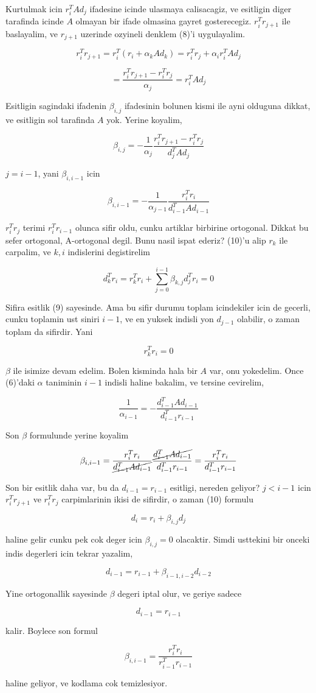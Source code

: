 \documentclass[12pt,fleqn]{article}\usepackage{../common}
\begin{document}
Kurtulmak icin $r_i^TAd_j$ ifadesine icinde ulasmaya calisacagiz, ve
esitligin diger tarafinda icinde $A$ olmayan bir ifade olmasina gayret
gosterecegiz. $r_i^Tr_{j+1}$ ile baslayalim, ve $r_{j+1}$ uzerinde ozyineli
denklem (8)'i uygulayalim. 

\[ r_i^Tr_{j+1} = r_i^T (r_i + \alpha_k A d_k)  = r_i^Tr_j + \alpha_i r_i^TAd_j \]

\[ = \frac{ r_i^Tr_{j+1} - r_i^Tr_j }{\alpha_j} =  r_i^TAd_j \]

Esitligin sagindaki ifadenin $\beta_{i,j}$ ifadesinin bolunen kismi ile
ayni olduguna dikkat, ve esitligin sol tarafinda $A$ yok. Yerine koyalim, 

\[ \beta_{i,j} = - \frac{ 1}{\alpha_j}\frac{  r_i^Tr_{j+1} - r_i^Tr_j }{d_j^TAd_j} \]

$j = i -1$, yani $\beta_{i,i-1}$ icin

\[ \beta_{i,i-1} = - \frac{ 1}{\alpha_{j-1}}\frac{  r_i^Tr_i  }{d_{i-1}^TAd_{i-1}} \]

$r_i^Tr_j$ terimi $r_i^Tr_{i-1}$ olunca sifir oldu, cunku artiklar birbirine ortogonal. 
Dikkat bu sefer ortogonal, A-ortogonal degil. Bunu nasil ispat ederiz? 
(10)'u alip $r_k$ ile carpalim, ve $k,i$ indislerini degistirelim

\[ d_k^Tr_i = r_k^Tr_i + \sum _{ j=0}^{i-1} \beta_{k,j}d_j ^Tr_i = 0
\]

Sifira esitlik (9) sayesinde. Ama bu sifir durumu toplam icindekiler icin
de gecerli, cunku toplamin ust siniri $i-1$, ve en yuksek indisli yon
$d_{j-1}$ olabilir, o zaman toplam da sifirdir. Yani

\[  r_k^Tr_i  = 0 \]

$\beta$ ile isimize devam edelim. Bolen kisminda hala bir $A$ var, onu
yokedelim. Once (6)'daki $\alpha$ taniminin $i-1$ indisli haline bakalim, ve
tersine cevirelim, 

\[ \frac{ 1}{\alpha_{i-1}} = -\frac{d_{i-1}^T A d_{i-1} }{d_{i-1}^Tr_{i-1}} 
\]

Son $\beta$ formulunde yerine koyalim

\[ \beta_{i,i-1} = 
\frac{  r_i^Tr_i  }{ \cancel{d_{i-1}^TAd_{i-1}}} 
\frac{\cancel{d_{i-1}^T A d_{i-1}}}{d_{i-1}^Tr_{i-1}}
= 
\frac{  r_i^Tr_i  }{d_{i-1}^Tr_{i-1}}
\]


Son bir esitlik daha var, bu da $d_{i-1} = r_{i-1}$ esitligi, nereden
geliyor?  $j < i-1$ icin $r_i^Tr_{j+1}$ ve $r_i^Tr_{j}$ carpimlarinin ikisi
de sifirdir, o zaman (10) formulu

\[ d_i = r_i + \beta_{i,j}d_j \]

haline gelir cunku pek cok deger icin $\beta_{i,j} = 0$ olacaktir. Simdi
usttekini bir onceki indis degerleri icin tekrar yazalim,

\[ d_{i-1} = r_{i-1} + \beta_{i-1,i-2}d_{i-2} \]

Yine ortogonallik sayesinde $\beta$ degeri iptal olur, ve geriye sadece 

\[ d_{i-1} = r_{i-1} \]

kalir. Boylece son formul

\[ \beta_{i,i-1} = 
\frac{  r_i^Tr_i  }{r_{i-1}^Tr_{i-1}}
\]

haline geliyor, ve kodlama cok temizlesiyor. 


\end{document}
